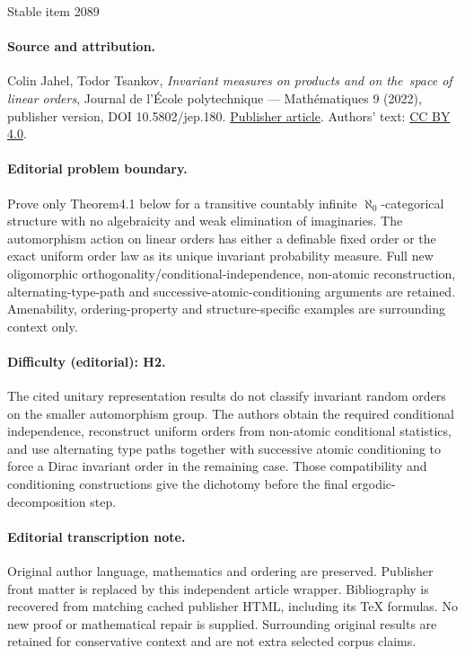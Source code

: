 \documentclass[11pt]{article}
\theoremstyle{plain}
\theoremstyle{definition}
\begin{document}
\begin{center}{\Large Stable item 2089}\end{center}
\paragraph{Source and attribution.}
Colin Jahel, Todor Tsankov, \emph{Invariant measures on products and on the space of linear orders}, Journal de l’École polytechnique — Mathématiques 9 (2022), publisher version, DOI 10.5802/jep.180. \href{https://jep.centre-mersenne.org/articles/10.5802/jep.180/}{Publisher article}. Authors' text: \href{https://creativecommons.org/licenses/by/4.0/}{CC BY 4.0}.
\paragraph{Editorial problem boundary.}
Prove only Theorem4.1 below for a transitive countably infinite \(\aleph_0\)-categorical structure with no algebraicity and weak elimination of imaginaries. The automorphism action on linear orders has either a definable fixed order or the exact uniform order law as its unique invariant probability measure. Full new oligomorphic orthogonality/conditional-independence, non-atomic reconstruction, alternating-type-path and successive-atomic-conditioning arguments are retained. Amenability, ordering-property and structure-specific examples are surrounding context only.
\paragraph{Difficulty (editorial): H2.}
The cited unitary representation results do not classify invariant random orders on the smaller automorphism group. The authors obtain the required conditional independence, reconstruct uniform orders from non-atomic conditional statistics, and use alternating type paths together with successive atomic conditioning to force a Dirac invariant order in the remaining case. Those compatibility and conditioning constructions give the dichotomy before the final ergodic-decomposition step.
\paragraph{Editorial transcription note.}
Original author language, mathematics and ordering are preserved. Publisher front matter is replaced by this independent article wrapper. Bibliography is recovered from matching cached publisher HTML, including its TeX formulas. No new proof or mathematical repair is supplied. Surrounding original results are retained for conservative context and are not extra selected corpus claims.
\clearpage
\end{document}
